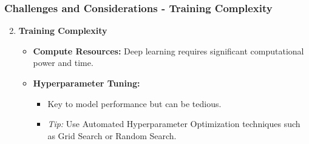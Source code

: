 \documentclass[aspectratio=169]{beamer}
\begin{document}
\begin{frame}[fragile]
    \frametitle{Challenges and Considerations - Training Complexity}
    \begin{enumerate}
        \setcounter{enumi}{1}
        \item \textbf{Training Complexity}
        \begin{itemize}
            \item \textbf{Compute Resources:} Deep learning requires significant computational power and time.
            \item \textbf{Hyperparameter Tuning:} 
            \begin{itemize}
                \item Key to model performance but can be tedious.
                \item \textit{Tip:} Use Automated Hyperparameter Optimization techniques such as Grid Search or Random Search.
            \end{itemize}
        \end{itemize}
    \end{enumerate}
\end{frame}
\end{document}
